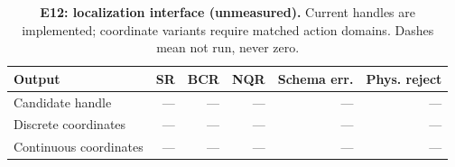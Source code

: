 \begin{table}[!ht]
\centering\small
\caption{\textbf{E12: localization interface (unmeasured).} Current handles are implemented; coordinate variants require matched action domains. Dashes mean not run, never zero.}
\begin{tabularx}{\textwidth}{@{}Xrrrrr@{}}\toprule
Output & SR & BCR & NQR & Schema err. & Phys. reject\\\midrule
Candidate handle & --- & --- & --- & --- & ---\\
Discrete coordinates & --- & --- & --- & --- & ---\\
Continuous coordinates & --- & --- & --- & --- & ---\\
\bottomrule
\end{tabularx}
\end{table}
